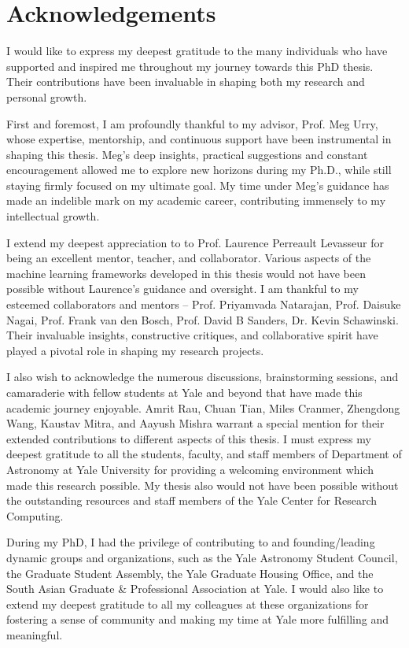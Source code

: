 \documentclass[letterpaper,10pt]{yalephd}
\begin{document}
\chapter{Acknowledgements} %
I would like to express my deepest gratitude to the many individuals who have supported and inspired me throughout my journey towards this PhD thesis. Their contributions have been invaluable in shaping both my research and personal growth.

First and foremost, I am profoundly thankful to my advisor, Prof. Meg Urry, whose expertise, mentorship, and continuous support have been instrumental in shaping this thesis. Meg's deep insights, practical suggestions and constant encouragement allowed me to explore new horizons during my Ph.D., while still staying firmly focused on my ultimate goal. My time under Meg's guidance has made an indelible mark on my academic career, contributing immensely to my intellectual growth.

I extend my deepest appreciation to to Prof. Laurence Perreault Levasseur for being an excellent mentor, teacher, and collaborator. Various aspects of the machine learning frameworks developed in this thesis would not have been possible without Laurence's guidance and oversight. I am thankful to my esteemed collaborators and mentors -- Prof. Priyamvada Natarajan, Prof. Daisuke Nagai, Prof. Frank van den Bosch, Prof. David B Sanders, Dr. Kevin Schawinski. Their invaluable insights, constructive critiques, and collaborative spirit have played a pivotal role in shaping my research projects. 

I also wish to acknowledge the numerous discussions, brainstorming sessions, and camaraderie with fellow students at Yale and beyond that have made this academic journey enjoyable. Amrit Rau, Chuan Tian, Miles Cranmer, Zhengdong Wang, Kaustav Mitra, and Aayush Mishra warrant a special mention for their extended contributions to different aspects of this thesis. I must express my deepest gratitude to all the students, faculty, and staff members of Department of Astronomy at Yale University for providing a welcoming environment which made this research possible. My thesis also would not have been possible without the outstanding resources and staff members of the Yale Center for Research Computing. 

During my PhD, I had the privilege of contributing to and founding/leading dynamic groups and organizations, such as the Yale Astronomy Student Council, the Graduate Student Assembly, the Yale Graduate Housing Office, and the South Asian Graduate \& Professional Association at Yale. I would also like to extend my deepest gratitude to all my colleagues at these organizations for fostering a sense of community and making my time at Yale more fulfilling and meaningful. 
\end{document}
